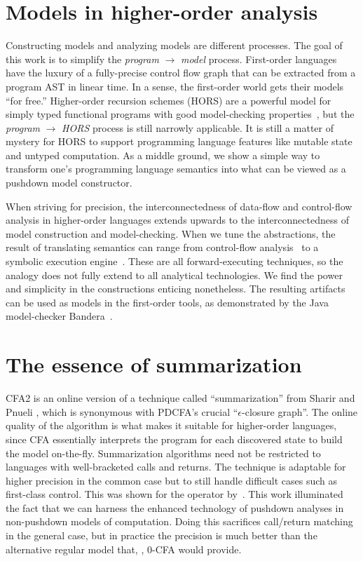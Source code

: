 \section{Models in higher-order analysis}

Constructing models and analyzing models are different processes.
%
The goal of this work is to simplify the \textit{program} $\to$ \textit{model} process.
%
First-order languages have the luxury of a fully-precise control flow graph that can be extracted from a program AST in linear time.
%
In a sense, the first-order world gets their models ``for free.''
%
Higher-order recursion schemes (HORS) are a powerful model for simply typed functional programs with good model-checking properties~\citep{dvanhorn:Ong2006ModelChecking}, but the \textit{program} $\to$ \textit{HORS} process is still narrowly applicable.
%
It is still a matter of mystery for HORS to support programming language features like mutable state and untyped computation.
As a middle ground, we show a simple way to transform one's programming language semantics into what can be viewed as a pushdown model constructor.

When striving for precision, the interconnectedness of data-flow and control-flow analysis in higher-order languages extends upwards to the interconnectedness of model construction and model-checking.
%
When we tune the abstractions, the result of translating semantics can range from control-flow analysis~\citep{dvanhorn:VanHorn2010Abstracting} to a symbolic execution engine~\citep{dvanhorn:TobinHochstadt2012Higherorder}.
%
These are all forward-executing techniques, so the analogy does not fully extend to all analytical technologies.
%
We find the power and simplicity in the constructions enticing nonetheless.
%
The resulting artifacts can be used as models in the first-order tools, as demonstrated by the Java model-checker Bandera~\citep{ianjohnson:bandera}.

\section{The essence of summarization}

CFA2 is an online version of a technique called ``summarization'' from Sharir and Pnueli \citep[Chapter 7]{local:muchnick:jones:flow-analysis:1981}, which is synonymous with PDCFA's crucial ``$\epsilon$-closure graph''.
%
The online quality of the algorithm is what makes it suitable for higher-order languages, since CFA essentially interprets the program for each discovered state to build the model on-the-fly.
%
Summarization algorithms need not be restricted to languages with well-bracketed calls and returns.
%
The technique is adaptable for higher precision in the common case but to still handle difficult cases such as first-class control.
%
This was shown for the  operator by~\citet{ianjohnson:Vardoulakis2011Pushdown}.
%
This work illuminated the fact that we can harness the enhanced technology of pushdown analyses in non-pushdown models of computation.
%
Doing this sacrifices call/return matching in the general case, but in practice the precision is much better than the alternative regular model that, \eg, 0-CFA would provide.

